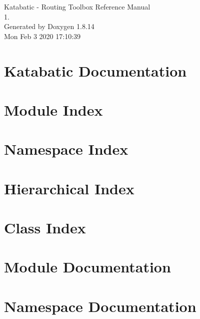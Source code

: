 \documentclass[a4paper]{asimbook}
\begin{document}
   \begin{titlepage}
     \vspace*{7cm}
     \begin{center}
     {\Large Katabatic -\/ Routing Toolbox Reference Manual\\[1ex]\large 1. }\\
     \vspace*{1cm}
     {\large Generated by Doxygen 1.8.14}\\
     \vspace*{0.5cm}
     {\small Mon Feb 3 2020 17:10:39}\\
     \end{center}
   \end{titlepage}

   \clearemptydoublepage

   \tableofcontents
   \clearemptydoublepage

\chapter{Katabatic Documentation}
\label{index}\hypertarget{index}{}
\chapter{Module Index}

\chapter{Namespace Index}

\chapter{Hierarchical Index}

\chapter{Class Index}

\chapter{Module Documentation}


\chapter{Namespace Documentation}







\end{document}
